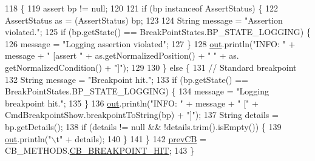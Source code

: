 \begin{DoxyCode}
118                                                         \{
119     assert bp != null;
120 
121     \textcolor{keywordflow}{if} (bp instanceof AssertStatus) \{
122       AssertStatus as = (AssertStatus) bp;
123 
124       String message = \textcolor{stringliteral}{"Assertion violated."};
125       \textcolor{keywordflow}{if} (bp.getState() == BreakPointStates.BP\_STATE\_LOGGING) \{
126         message = \textcolor{stringliteral}{"Logging assertion violated"};
127       \}
128       \hyperlink{classgov_1_1nasa_1_1jpf_1_1inspector_1_1client_1_1_j_p_f_client_callback_handler_ad51e474b5613fa4a46c8965c069fb9f7}{out}.println(\textcolor{stringliteral}{"INFO: "} + message + \textcolor{stringliteral}{" [assert "} + as.getNormalizedPosition() + \textcolor{stringliteral}{" "} + as.
      getNormalizedCondition() + \textcolor{stringliteral}{"]"});
129 
130     \} \textcolor{keywordflow}{else} \{
131       \textcolor{comment}{// Standard breakpoint}
132       String message = \textcolor{stringliteral}{"Breakpoint hit."};
133       \textcolor{keywordflow}{if} (bp.getState() == BreakPointStates.BP\_STATE\_LOGGING) \{
134         message = \textcolor{stringliteral}{"Logging breakpoint hit."};
135       \}
136       \hyperlink{classgov_1_1nasa_1_1jpf_1_1inspector_1_1client_1_1_j_p_f_client_callback_handler_ad51e474b5613fa4a46c8965c069fb9f7}{out}.println(\textcolor{stringliteral}{"INFO: "} + message + \textcolor{stringliteral}{" ["} + CmdBreakpointShow.breakpointToString(bp) + \textcolor{stringliteral}{"]"});
137       String details = bp.getDetails();
138       \textcolor{keywordflow}{if} (details != null && !details.trim().isEmpty()) \{
139         \hyperlink{classgov_1_1nasa_1_1jpf_1_1inspector_1_1client_1_1_j_p_f_client_callback_handler_ad51e474b5613fa4a46c8965c069fb9f7}{out}.println(\textcolor{stringliteral}{"\(\backslash\)t"} + details);
140       \}
141     \}
142     \hyperlink{classgov_1_1nasa_1_1jpf_1_1inspector_1_1client_1_1_j_p_f_client_callback_handler_a1e5272638212d9246e98ced9a5a78012}{prevCB} = CB\_METHODS.\hyperlink{enumgov_1_1nasa_1_1jpf_1_1inspector_1_1interfaces_1_1_inspector_call_backs_1_1_c_b___m_e_t_h_o_d_s_a7e99fa3c2f2ede89ef9223836fe06bbf}{CB\_BREAKPOINT\_HIT};
143   \}
\end{DoxyCode}
